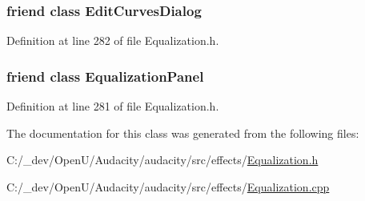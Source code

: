 \subsubsection[{\texorpdfstring{Edit\+Curves\+Dialog}{EditCurvesDialog}}]{\setlength{\rightskip}{0pt plus 5cm}friend class {\bf Edit\+Curves\+Dialog}\hspace{0.3cm}{\ttfamily [friend]}}\hypertarget{class_effect_equalization_afc1f01b53a61ddd7729cd65b38057f41}{}\label{class_effect_equalization_afc1f01b53a61ddd7729cd65b38057f41}


Definition at line 282 of file Equalization.\+h.

\subsubsection[{\texorpdfstring{Equalization\+Panel}{EqualizationPanel}}]{\setlength{\rightskip}{0pt plus 5cm}friend class {\bf Equalization\+Panel}\hspace{0.3cm}{\ttfamily [friend]}}\hypertarget{class_effect_equalization_a2e4782c298f7e0f22608a5a5d5a55e69}{}\label{class_effect_equalization_a2e4782c298f7e0f22608a5a5d5a55e69}


Definition at line 281 of file Equalization.\+h.



The documentation for this class was generated from the following files\+:\begin{DoxyCompactItemize}
\item 
C\+:/\+\_\+dev/\+Open\+U/\+Audacity/audacity/src/effects/\hyperlink{_equalization_8h}{Equalization.\+h}\item 
C\+:/\+\_\+dev/\+Open\+U/\+Audacity/audacity/src/effects/\hyperlink{_equalization_8cpp}{Equalization.\+cpp}\end{DoxyCompactItemize}

